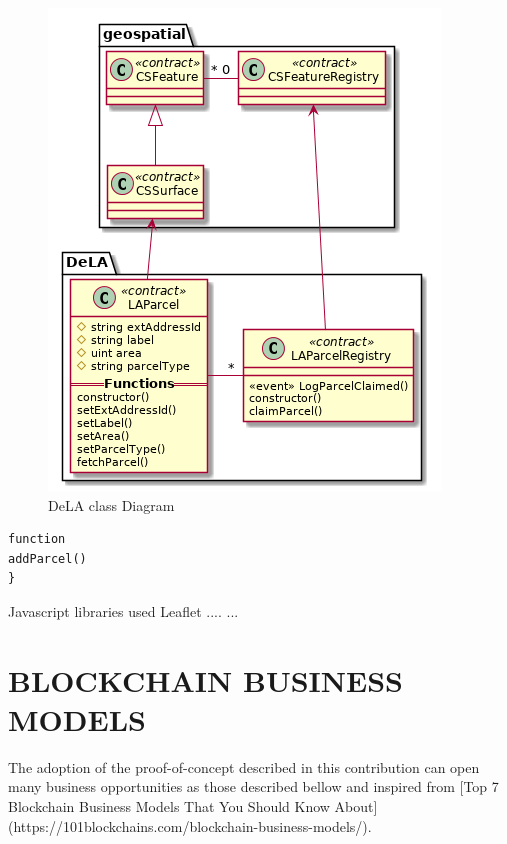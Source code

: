 \documentclass{isprs} %
\begin{document}
\begin{figure}[ht!]
\begin{center}
		\includegraphics[width=1.0\columnwidth]{figures/class-dela.png}
	\caption{DeLA class Diagram}
\label{fig:figure_placement}
\end{center}
\end{figure}


\begin{verbatim}
function
addParcel()
}
\end{verbatim}


Javascript libraries used 
Leaflet ....
...


\section{BLOCKCHAIN BUSINESS MODELS}\label{sec:BLOCKCHAIN BUSINESS MODELS}

The adoption of the proof-of-concept described in this contribution can open many business opportunities as those described bellow and inspired from [Top 7 Blockchain Business Models That You Should Know About](https://101blockchains.com/blockchain-business-models/).
\end{document}
